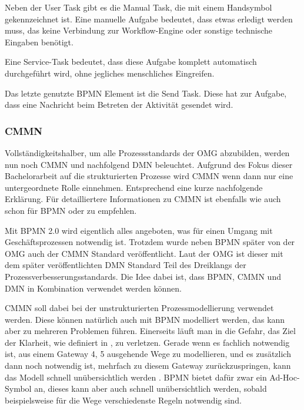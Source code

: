 Neben der User Task gibt es die Manual Task, die mit einem Handsymbol gekennzeichnet ist. Eine manuelle Aufgabe bedeutet, dass etwas erledigt werden muss, das keine Verbindung zur Workflow-Engine oder sonstige technische Eingaben benötigt. \citep[vgl.][S. 34]{bruce_englisch_2011}

Eine Service-Task bedeutet, dass diese Aufgabe komplett automatisch durchgeführt wird, ohne jegliches menschliches Eingreifen. \citep[vgl.][S. 21]{bruce_englisch_2011}

Das letzte genutzte \ac{BPMN} Element ist die Send Task. Diese hat zur Aufgabe, dass eine Nachricht beim Betreten der Aktivität gesendet wird. \citep[vgl.][S. 95]{bruce_englisch_2011}

\subsubsection{\acl{CMMN}}

Vollständigkeitshalber, um alle Prozessstandards der \ac{OMG} abzubilden, werden nun noch \ac{CMMN} und nachfolgend \acs{DMN} beleuchtet. Aufgrund des Fokus dieser Bachelorarbeit auf die strukturierten Prozesse wird \ac{CMMN} wenn dann nur eine untergeordnete Rolle einnehmen. Entsprechend eine kurze nachfolgende Erklärung. Für detailliertere Informationen zu \ac{CMMN} ist ebenfalls wie auch schon für \ac{BPMN} \cite{freund_praxishandbuch_2017} oder \cite{bruce_cmmn_2020} zu empfehlen.

\label{par:dreiklang_prozessverbesserungsstandards}
Mit \ac{BPMN} 2.0 wird eigentlich alles angeboten, was für einen Umgang mit Geschäftsprozessen notwendig ist. Trotzdem wurde neben \ac{BPMN} später von der \ac{OMG} auch der \ac{CMMN} Standard veröffentlicht. Laut der \ac{OMG} ist dieser mit dem später veröffentlichten \ac{DMN} Standard Teil des Dreiklangs der Prozessverbesserungsstandards. Die Idee dabei ist, dass \ac{BPMN}, \ac{CMMN} und \ac{DMN} in Kombination verwendet werden können. \citep[vgl.][]{object_management_group_case_2016}

\ac{CMMN} soll dabei bei der unstrukturierten Prozessmodellierung verwendet werden. Diese können natürlich auch mit \ac{BPMN} modelliert werden, das kann aber zu mehreren Problemen führen. Einerseits läuft man in die Gefahr, das Ziel der Klarheit, wie definiert in , zu verletzen. Gerade wenn es fachlich notwendig ist, aus einem Gateway 4, 5 ausgehende Wege zu modellieren, und es zusätzlich dann noch notwendig ist, mehrfach zu diesem Gateway zurückzuspringen, kann das Modell schnell unübersichtlich werden \citep[vgl.][S. 9]{freund_praxishandbuch_2017}. \ac{BPMN} bietet dafür zwar ein Ad-Hoc-Symbol an, dieses kann aber auch schnell unübersichtlich werden, sobald beispielsweise für die Wege verschiedenste Regeln notwendig sind. 

